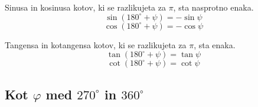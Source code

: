                         
                            Sinusa in kosinusa kotov, ki se razlikujeta za $\pi$, sta nasprotno enaka. 
                            $$ \sin\left(180^\circ+\psi\right) = -\sin\psi $$
                            $$ \cos\left(180^\circ+\psi\right) = -\cos\psi $$
                        

                        
                            Tangensa in kotangensa kotov, ki se razlikujeta za $\pi$, sta enaka.
                            $$ \tan\left(180^\circ+\psi\right) = \tan\psi $$
                            $$ \cot\left(180^\circ+\psi\right) = \cot\psi $$        
                              
        
            


        


        
            \subsection{Kot $\varphi$ med $270^\circ$ in $360^\circ$}
            
            

